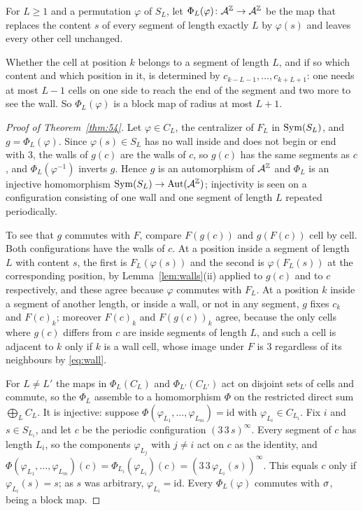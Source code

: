 \begin{definition}
For $L\ge1$ and a permutation $\varphi$ of $S_L$, let $\Phi_L(\varphi)\colon\mathcal{A}^{\mathbb{Z}}\to\mathcal{A}^{\mathbb{Z}}$ be the map that replaces the content $s$ of every segment of length exactly $L$ by $\varphi(s)$ and leaves every other cell unchanged.
\end{definition}

Whether the cell at position $k$ belongs to a segment of length $L$, and if so which content and which position in it, is determined by $c_{k-L-1},\dots,c_{k+L+1}$: one needs at most $L-1$ cells on one side to reach the end of the segment and two more to see the wall. So $\Phi_L(\varphi)$ is a block map of radius at most $L+1$.

\begin{proof}[Proof of Theorem~\ref{thm:54}]
Let $\varphi\in C_L$, the centralizer of $F_L$ in $\operatorname{Sym}(S_L)$, and $g=\Phi_L(\varphi)$. Since $\varphi(s)\in S_L$ has no wall inside and does not begin or end with $3$, the walls of $g(c)$ are the walls of $c$, so $g(c)$ has the same segments as $c$, and $\Phi_L(\varphi^{-1})$ inverts $g$. Hence $g$ is an automorphism of $\mathcal{A}^{\mathbb{Z}}$ and $\Phi_L$ is an injective homomorphism $\operatorname{Sym}(S_L)\to\operatorname{Aut}(\mathcal{A}^{\mathbb{Z}})$; injectivity is seen on a configuration consisting of one wall and one segment of length $L$ repeated periodically.

To see that $g$ commutes with $F$, compare $F(g(c))$ and $g(F(c))$ cell by cell. Both configurations have the walls of $c$. At a position inside a segment of length $L$ with content $s$, the first is $F_L(\varphi(s))$ and the second is $\varphi(F_L(s))$ at the corresponding position, by Lemma~\ref{lem:walls}(ii) applied to $g(c)$ and to $c$ respectively, and these agree because $\varphi$ commutes with $F_L$. At a position $k$ inside a segment of another length, or inside a wall, or not in any segment, $g$ fixes $c_k$ and $F(c)_k$; moreover $F(c)_k$ and $F(g(c))_k$ agree, because the only cells where $g(c)$ differs from $c$ are inside segments of length $L$, and such a cell is adjacent to $k$ only if $k$ is a wall cell, whose image under $F$ is $3$ regardless of its neighbours by \eqref{eq:wall}.

For $L\ne L'$ the maps in $\Phi_L(C_L)$ and $\Phi_{L'}(C_{L'})$ act on disjoint sets of cells and commute, so the $\Phi_L$ assemble to a homomorphism $\Phi$ on the restricted direct sum $\bigoplus_L C_L$. It is injective: suppose $\Phi(\varphi_{L_1},\dots,\varphi_{L_m})=\mathrm{id}$ with $\varphi_{L_i}\in C_{L_i}$. Fix $i$ and $s\in S_{L_i}$, and let $c$ be the periodic configuration $(3\,3\,s)^{\infty}$. Every segment of $c$ has length $L_i$, so the components $\varphi_{L_j}$ with $j\ne i$ act on $c$ as the identity, and $\Phi(\varphi_{L_1},\dots,\varphi_{L_m})(c)=\Phi_{L_i}(\varphi_{L_i})(c)=(3\,3\,\varphi_{L_i}(s))^{\infty}$. This equals $c$ only if $\varphi_{L_i}(s)=s$; as $s$ was arbitrary, $\varphi_{L_i}=\mathrm{id}$. Every $\Phi_L(\varphi)$ commutes with $\sigma$, being a block map.


\end{proof}
